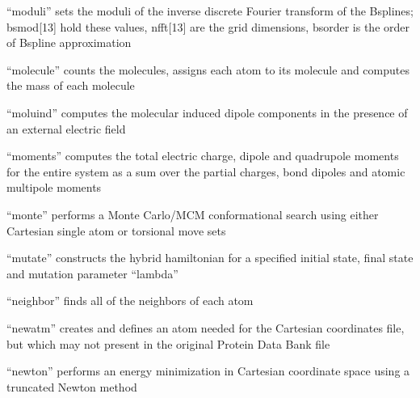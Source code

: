 \documentclass[letterpaper,11pt,english]{sphinxmanual}
\begin{document}





“moduli” sets the moduli of the inverse discrete Fourier transform of the B\sphinxhyphen{}splines; bsmod{[}1\sphinxhyphen{}3{]} hold these values, nfft{[}1\sphinxhyphen{}3{]} are the grid dimensions, bsorder is the order of B\sphinxhyphen{}spline approximation


“molecule” counts the molecules, assigns each atom to its molecule and computes the mass of each molecule


“moluind” computes the molecular induced dipole components in the presence of an external electric field


“moments” computes the total electric charge, dipole and quadrupole moments for the entire system as a sum over the partial charges, bond dipoles and atomic multipole moments


“monte” performs a Monte Carlo/MCM conformational search using either Cartesian single atom or torsional move sets


“mutate” constructs the hybrid hamiltonian for a specified initial state, final state and mutation parameter “lambda”



“neighbor” finds all of the neighbors of each atom


“newatm” creates and defines an atom needed for the Cartesian coordinates file, but which may not present in the original Protein Data Bank file


“newton” performs an energy minimization in Cartesian coordinate space using a truncated Newton method
\end{document}
